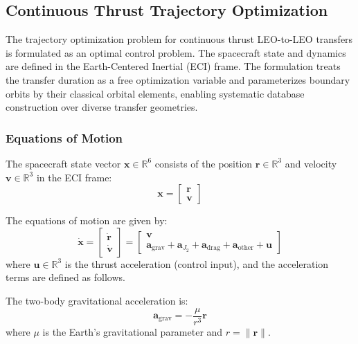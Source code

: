 \documentclass[a4paper,fleqn]{cas-dc}
\let\origsubsection\subsection
\renewcommand{\subsection}{\FloatBarrier\origsubsection}
\begin{document}
\subsection{Continuous Thrust Trajectory Optimization}\label{subsec:continuous_thrust}

The trajectory optimization problem for continuous thrust LEO-to-LEO transfers is formulated as an optimal control problem. The spacecraft state and dynamics are defined in the Earth-Centered Inertial (ECI) frame. The formulation treats the transfer duration as a free optimization variable and parameterizes boundary orbits by their classical orbital elements, enabling systematic database construction over diverse transfer geometries.

\subsubsection{Equations of Motion}

The spacecraft state vector $\mathbf{x} \in \mathbb{R}^6$ consists of the position $\mathbf{r} \in \mathbb{R}^3$ and velocity $\mathbf{v} \in \mathbb{R}^3$ in the ECI frame:
\begin{equation}
\mathbf{x} = \begin{bmatrix} \mathbf{r} \\ \mathbf{v} \end{bmatrix}
\end{equation}

The equations of motion are given by:
\begin{equation}\label{eq:eom}
\dot{\mathbf{x}} = \begin{bmatrix} \dot{\mathbf{r}} \\ \dot{\mathbf{v}} \end{bmatrix} = \begin{bmatrix} \mathbf{v} \\ \mathbf{a}_{\text{grav}} + \mathbf{a}_{J_2} + \mathbf{a}_{\text{drag}} + \mathbf{a}_{\text{other}} + \mathbf{u} \end{bmatrix}
\end{equation}
where $\mathbf{u} \in \mathbb{R}^3$ is the thrust acceleration (control input), and the acceleration terms are defined as follows.

The two-body gravitational acceleration is:
\begin{equation}
\mathbf{a}_{\text{grav}} = -\frac{\mu}{r^3}\mathbf{r}
\end{equation}
where $\mu$ is the Earth's gravitational parameter and $r = \|\mathbf{r}\|$.
\end{document}
